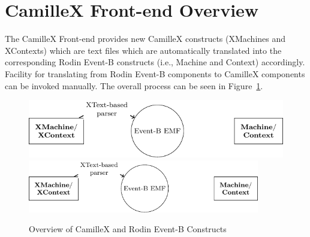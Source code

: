 \section{CamilleX Front-end Overview}
\label{sec:overview}

The CamilleX  Front-end provides new CamilleX constructs (XMachines and XContexts) which are text files which are automatically translated into the corresponding Rodin Event-B constructs (i.e., Machine and Context) accordingly.  Facility for translating from Rodin Event-B components to CamilleX components can be invoked manually. The overall process can be seen in Figure~\ref{fig:overview}.
\begin{figure}[!htbp]
  \centering
  \ifplastex
  \includegraphics[width=512]{tikz-overview}
  \else
  \includegraphics[width=0.9\textwidth]{tikz-overview}
  \fi
  \caption{Overview of CamilleX and Rodin Event-B Constructs}
  \label{fig:overview}
\end{figure}

